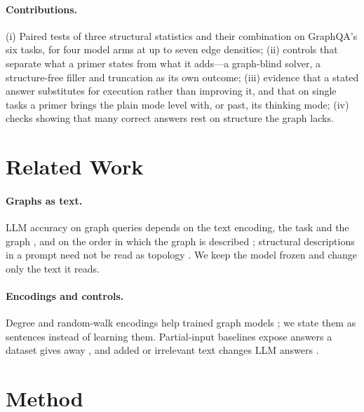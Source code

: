 \documentclass[11pt]{article}
\begin{document}
\paragraph{Contributions.} (i) Paired tests of three structural statistics and their combination on GraphQA's six tasks, for four model arms at up to seven edge densities; (ii) controls that separate what a primer states from what it adds---a graph-blind solver, a structure-free filler and truncation as its own outcome; (iii) evidence that a stated answer substitutes for execution rather than improving it, and that on single tasks a primer brings the plain mode level with, or past, its thinking mode; (iv) checks showing that many correct answers rest on structure the graph lacks.

\section{Related Work}
\label{sec:related}
\paragraph{Graphs as text.} LLM accuracy on graph queries depends on the text encoding, the task and the graph \citep{fatemi2023talklikeagraph,wang2023nlgraph}, and on the order in which the graph is described \citep{ge2025graph}; structural descriptions in a prompt need not be read as topology \citep{huang2024can}. We keep the model frozen and change only the text it reads.

\paragraph{Encodings and controls.} Degree and random-walk encodings help trained graph models \citep{dwivedi2022graph,rampasek2022recipe}; we state them as sentences instead of learning them. Partial-input baselines expose answers a dataset gives away \citep{feng2019misleading}, and added or irrelevant text changes LLM answers \citep{levy2024sametask,shi2023distracted}.

\section{Method}
\label{sec:method}

\end{document}
